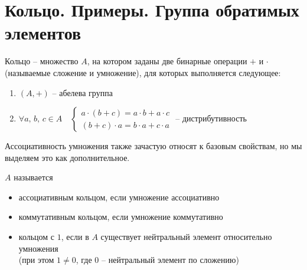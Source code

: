 
\section{Кольцо. Примеры. Группа обратимых элементов}
\begin{conj}
    Кольцо -- множество $A$, на котором заданы две бинарные операции $+$ и $\cdot$ (называемые сложение и умножение), для которых выполняется следующее:
\end{conj}
\begin{enumerate}
    \item $(A, +)$ -- абелева группа 
    \item $\forall a,\, b,\, c \in A \quad \begin{cases} a \cdot (b + c) = a \cdot b + a \cdot c \\  (b + c) \cdot a = b \cdot a + c \cdot a \end{cases}$ -- дистрибутивность
\end{enumerate}
\begin{notice}
    Ассоциативность умножения также зачастую относят к базовым свойствам, но мы выделяем это как дополнительное.
\end{notice}
  
$A$ называется
    \begin{itemize}
        \item ассоциативным кольцом, если умножение ассоциативно
        \item коммутативным кольцом, если умножение коммутативно
        \item кольцом с $1$, если в $A$ существует нейтральный элемент относительно умножения\\
        (при этом $1 \neq 0$, где $0$ -- нейтральный элемент по сложению)
    \end{itemize}
  
